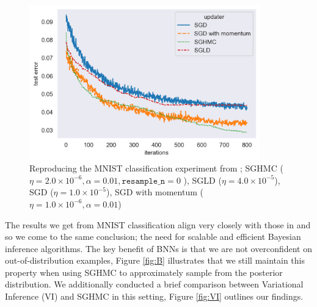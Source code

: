 \begin{figure}[h!]
\centering
\includegraphics[width=100mm]{parts/Images/MNIST.png}
\caption{Reproducing the MNIST classification experiment from \cite{sghmc}; SGHMC ($\eta = 2.0\times 10^{-6}, \alpha=0.01, \texttt{resample\_n} =0$ ), SGLD ($\eta = 4.0\times 10^{-5}$), SGD ($\eta = 1.0\times 10^{-5}$), SGD with momentum ($\eta = 1.0\times 10^{-6}, \alpha=0.01$)}
\label{fig:MNIST}
\end{figure}
The results we get from MNIST classification align very closely with those in \cite{sghmc} and so we come to the same conclusion; the need for scalable and efficient Bayesian inference algorithms. The key benefit of BNNs is that we are not overconfident on out-of-distribution examples, Figure \ref{fig:B} illustrates that we still maintain this property when using SGHMC to approximately sample from the posterior distribution. We additionally conducted a brief comparison between Variational Inference (VI) and SGHMC in this setting, Figure \ref{fig:VI} outlines our findings.
